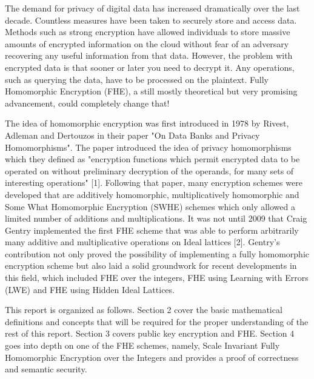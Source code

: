 \documentclass[../../main.tex]{subfiles}
\begin{document}
The demand for privacy of digital data has increased dramatically over the last decade. Countless measures have been taken to securely store and access data. Methods such as strong encryption have allowed individuals to store massive amounts of encrypted information on the cloud without fear of an adversary recovering any useful information from that data. However, the problem with encrypted data is that sooner or later you need to decrypt it. Any operations, such as querying the data, have to be processed on the plaintext. Fully Homomorphic Encryption (FHE), a still mostly theoretical but very promising advancement, could completely change that!

The idea of homomorphic encryption was first introduced in 1978 by Rivest, Adleman and Dertouzos in their paper "On Data Banks and Privacy Homomorphisms". The paper introduced the idea of privacy homomorphisms which they defined as "encryption functions which permit encrypted data to be operated on without preliminary decryption of the operands, for many sets of interesting operations" [1]. Following that paper, many encryption schemes were developed that are additively homomorphic, multiplicatively homomorphic and Some What Homomorphic Encryption (SWHE) schemes which only allowed a limited number of additions and multiplications. It was not until 2009 that Craig Gentry implemented the first FHE scheme that was able to perform arbitrarily many additive and multiplicative operations on Ideal lattices [2]. Gentry's contribution not only proved the possibility of implementing a fully homomorphic encryption scheme but also laid a solid groundwork for recent developments in this field, which included FHE over the integers, FHE using Learning with Errors (LWE) and FHE using Hidden Ideal Lattices.

This report is organized as follows. Section 2 cover the basic mathematical definitions and concepts that will be required for the proper understanding of the rest of this report. Section 3 covers public key encryption and FHE. Section 4 goes into depth on one of the FHE schemes, namely, Scale Invariant Fully Homomorphic Encryption over the Integers and provides a proof of correctness and semantic security. 
\end{document}
